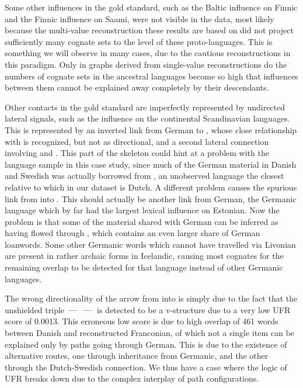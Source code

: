  \newpage 
 Some other influences in the gold standard, such as the Baltic influence on Finnic and the Finnic influence on Saami, were not visible in the data, most likely because the multi-value reconstruction these results are based on did not project sufficiently many cognate sets to the level of these proto-languages. This is something we will observe in many cases, due to the cautious reconstructions in this paradigm. Only in graphs derived from single-value reconstructions do the numbers of cognate sets in the ancestral languages become so high that influences between them cannot be explained away completely by their descendants.
 
 Other contacts in the gold standard are imperfectly represented by undirected lateral signals, such as the  influence on the continental Scandinavian languages. This is represented by an inverted link from German to , whose close relationship with  is recognized, but not as directional, and a second lateral connection involving  and . This part of the skeleton could hint at a problem with the language sample in this case study, since much of the German material in Danish and Swedish was actually borrowed from , an unobserved language the closest relative to which in our dataset is Dutch. A different problem causes the spurious link from  into . This should actually be another link from German, the Germanic language which by far had the largest lexical influence on Estonian. Now the problem is that some of the material shared with German can be inferred as having flowed through , which contains an even larger share of German loanwords. Some other Germanic words which cannot have travelled via Livonian are present in rather archaic forms in Icelandic, causing most cognates for the remaining overlap to be detected for that language instead of other Germanic languages.
 
 The wrong directionality of the arrow from  into  is simply due to the fact that the unshielded triple  $\kern 2pt\hbox{---}\kern 2pt$  $\kern 2pt\hbox{---}\kern 2pt$  is detected to be a v-structure due to a very low UFR score of 0.0013. This erroneous low score is due to high overlap of 461 words between Danish and reconstructed Franconian, of which not a single item can be explained only by paths going through German. This is due to the existence of alternative routes, one through inheritance from Germanic, and the other through the Dutch-Swedish connection. We thus have a case where the logic of UFR breaks down due to the complex interplay of path configurations.
 
